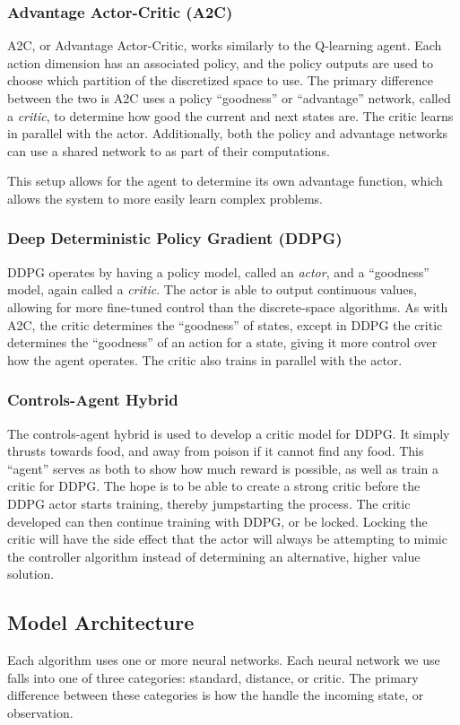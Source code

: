 \subsubsection{Advantage Actor-Critic (A2C)}
A2C, or Advantage Actor-Critic, works similarly to the Q-learning agent.
Each action dimension has an associated policy, and the policy outputs are used to
choose which partition of the discretized space to use.
The primary difference between the two is A2C uses a policy ``goodness'' or
``advantage'' network, called a \textit{critic}, to determine how good the current
and next states are.
The critic learns in parallel with the actor.
Additionally, both the policy and advantage networks can use a shared network to as
part of their computations.

This setup allows for the agent to determine its own advantage function, which
allows the system to more easily learn complex problems.

\subsubsection{Deep Deterministic Policy Gradient (DDPG)}
DDPG operates by having a policy model, called an \textit{actor}, and a ``goodness''
model, again called a \textit{critic}.
The actor is able to output continuous values, allowing for more fine-tuned control
than the discrete-space algorithms.
As with A2C, the critic determines the ``goodness'' of states, except in DDPG the
critic determines the ``goodness'' of an action for a state, giving it more control
over how the agent operates.
The critic also trains in parallel with the actor.

\subsubsection{Controls-Agent Hybrid}
The controls-agent hybrid is used to develop a critic model for DDPG\@.
It simply thrusts towards food, and away from poison if it cannot find any food.
This ``agent'' serves as both to show how much reward is possible, as well as train a
critic for DDPG\@.
The hope is to be able to create a strong critic before the DDPG actor starts
training, thereby jumpstarting the process.
The critic developed can then continue training with DDPG, or be locked.
Locking the critic will have the side effect that the actor will always be attempting
to mimic the controller algorithm instead of determining an alternative, higher value
solution.

\subsection{Model Architecture}\label{subsec:model-architecture}
Each algorithm uses one or more neural networks.
Each neural network we use falls into one of three categories: standard, distance, or
critic.
The primary difference between these categories is how the handle the incoming state,
or observation.

